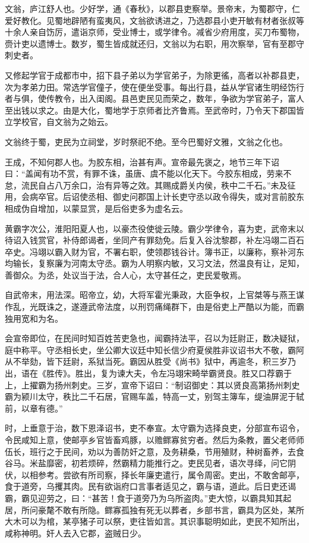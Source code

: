 \documentclass[]{article}
\begin{document}
文翁，庐江舒人也。少好学，通《春秋》，以郡县吏察举。景帝末，为蜀郡守，仁爱好教化。见蜀地辟陋有蛮夷风，文翁欲诱进之，乃选郡县小吏开敏有材者张叔等十余人亲自饬厉，遣诣京师，受业博士，或学律令。减省少府用度，买刀布蜀物，赍计吏以遗博士。数岁，蜀生皆成就还归，文翁以为右职，用次察举，官有至郡守刺史者。

又修起学官于成都市中，招下县子弟以为学官弟子，为除更徭，高者以补郡县吏，次为孝弟力田。常选学官僮子，使在便坐受事。每出行县，益从学官诸生明经饬行者与俱，使传教令，出入闺阁。县邑吏民见而荣之，数年，争欲为学官弟子，富人至出钱以求之。由是大化，蜀地学于京师者比齐鲁焉。至武帝时，乃令天下郡国皆立学校官，自文翁为之始云。

文翁终于蜀，吏民为立祠堂，岁时祭祀不绝。至今巴蜀好文雅，文翁之化也。

王成，不知何郡人也。为胶东相，治甚有声。宣帝最先褒之，地节三年下诏曰：``盖闻有功不赏，有罪不诛，虽唐、虞不能以化天下。今胶东相成，劳来不怠，流民自占八万余口，治有异等之效。其赐成爵关内侯，秩中二千石。''未及征用，会病卒官。后诏使丞相、御史问郡国上计长吏守丞以政令得失，或对言前胶东相成伪自增加，以蒙显赏，是后俗吏多为虚名云。

黄霸字次公，淮阳阳夏人也，以豪杰役使徙云陵。霸少学律令，喜为吏，武帝末以待诏入钱赏官，补侍郎谒者，坐同产有罪劾免。后复入谷沈黎郡，补左冯翊二百石卒史。冯翊以霸入财为官，不署右职，使领郡钱谷计。簿书正，以廉称，察补河东均输长，复察廉为河南太守丞。霸为人明察内敏，又习文法，然温良有让，足知，善御众。为丞，处议当于法，合人心，太守甚任之，吏民爱敬焉。

自武帝末，用法深。昭帝立，幼，大将军霍光秉政，大臣争权，上官桀等与燕王谋作乱，光既诛之，遂遵武帝法度，以刑罚痛绳群下，由是俗吏上严酷以为能，而霸独用宽和为名。

会宣帝即位，在民间时知百姓苦吏急也，闻霸持法平，召以为廷尉正，数决疑狱，庭中称平。守丞相长史，坐公卿大议廷中知长信少府夏侯胜非议诏书大不敬，霸阿从不举劾，皆下廷尉，系狱当死。霸因从胜受《尚书》狱中，再逾冬，积三岁乃出，语在《胜传》。胜出，复为谏大夫，令左冯翊宋畸举霸贤良。胜又口荐霸于上，上擢霸为扬州刺史。三岁，宣帝下诏曰：``制诏御史：其以贤良高第扬州刺史霸为颍川太守，秩比二千石居，官赐车盖，特高一丈，别驾主簿车，缇油屏泥于轼前，以章有德。''

时，上垂意于治，数下恩泽诏书，吏不奉宣。太守霸为选择良吏，分部宣布诏令，令民咸知上意，使邮亭乡官皆畜鸡豚，以赡鳏寡贫穷者。然后为条教，置父老师师伍长，班行之于民间，劝以为善防奸之意，及务耕桑，节用殖财，种树畜养，去食谷马。米盐靡密，初若烦碎，然霸精力能推行之。吏民见者，语次寻绎，问它阴伏，以相参考。尝欲有所司察，择长年廉吏遣行，属令周密。吏出，不敢舍邮亭，食于道旁，乌攫其肉。民有欲诣府口言事者适见之，霸与语，道此。后日吏还谒霸，霸见迎劳之，曰：``甚苦！食于道旁乃为乌所盗肉。''吏大惊，以霸具知其起居，所问豪氂不敢有所隐。鳏寡孤独有死无以葬者，乡部书言，霸具为区处，某所大木可以为棺，某亭猪子可以祭，吏往皆如言。其识事聪明如此，吏民不知所出，咸称神明。奸人去入它郡，盗贼日少。
\end{document}

